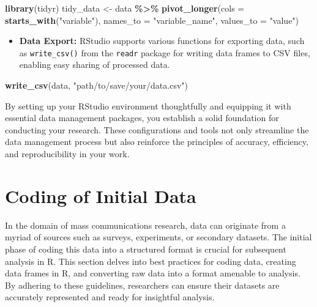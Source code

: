 \documentclass[
]{book}
\newenvironment{Shaded}{\begin{snugshade}}{\end{snugshade}}
\newcommand{\AttributeTok}[1]{\textcolor[rgb]{0.13,0.29,0.53}{#1}}
\newcommand{\FunctionTok}[1]{\textcolor[rgb]{0.13,0.29,0.53}{\textbf{#1}}}
\newcommand{\NormalTok}[1]{#1}
\newcommand{\OtherTok}[1]{\textcolor[rgb]{0.56,0.35,0.01}{#1}}
\newcommand{\SpecialCharTok}[1]{\textcolor[rgb]{0.81,0.36,0.00}{\textbf{#1}}}
\newcommand{\StringTok}[1]{\textcolor[rgb]{0.31,0.60,0.02}{#1}}
\providecommand{\tightlist}{%
  \setlength{\itemsep}{0pt}\setlength{\parskip}{0pt}}
\begin{document}
\begin{Shaded}
\begin{Highlighting}[]
\FunctionTok{library}\NormalTok{(tidyr)}
\NormalTok{tidy\_data }\OtherTok{\textless{}{-}}\NormalTok{ data }\SpecialCharTok{\%\textgreater{}\%}
  \FunctionTok{pivot\_longer}\NormalTok{(}\AttributeTok{cols =} \FunctionTok{starts\_with}\NormalTok{(}\StringTok{"variable"}\NormalTok{), }\AttributeTok{names\_to =} \StringTok{"variable\_name"}\NormalTok{, }\AttributeTok{values\_to =} \StringTok{"value"}\NormalTok{)}
\end{Highlighting}
\end{Shaded}

\begin{itemize}
\tightlist
\item
  \textbf{Data Export:} RStudio supports various functions for exporting data, such as \texttt{write\_csv()} from the \texttt{readr} package for writing data frames to CSV files, enabling easy sharing of processed data.
\end{itemize}

\begin{Shaded}
\begin{Highlighting}[]
\FunctionTok{write\_csv}\NormalTok{(data, }\StringTok{"path/to/save/your/data.csv"}\NormalTok{)}
\end{Highlighting}
\end{Shaded}

By setting up your RStudio environment thoughtfully and equipping it with essential data management packages, you establish a solid foundation for conducting your research. These configurations and tools not only streamline the data management process but also reinforce the principles of accuracy, efficiency, and reproducibility in your work.

\hypertarget{coding-of-initial-data}{%
\section{Coding of Initial Data}\label{coding-of-initial-data}}

In the domain of mass communications research, data can originate from a myriad of sources such as surveys, experiments, or secondary datasets. The initial phase of coding this data into a structured format is crucial for subsequent analysis in R. This section delves into best practices for coding data, creating data frames in R, and converting raw data into a format amenable to analysis. By adhering to these guidelines, researchers can ensure their datasets are accurately represented and ready for insightful analysis.
\end{document}
